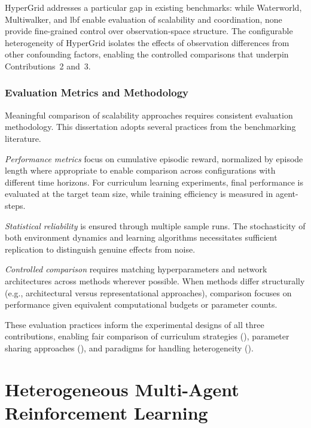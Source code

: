 HyperGrid addresses a particular gap in existing benchmarks: 
while Waterworld, Multiwalker, and \gls{lbf} enable evaluation 
of scalability and coordination, none provide fine-grained 
control over observation-space structure. 
The configurable heterogeneity of HyperGrid isolates the 
effects of observation differences from other confounding factors, 
enabling the controlled comparisons that underpin Contributions~2 and~3.

\subsubsection{Evaluation Metrics and Methodology}

Meaningful comparison of scalability approaches requires consistent evaluation methodology. 
This dissertation adopts several practices from the benchmarking literature.

\textit{Performance metrics} focus on cumulative episodic reward, 
normalized by episode length where appropriate to enable comparison 
across configurations with different time horizons. 
For curriculum learning experiments, final performance is evaluated 
at the target team size, while training efficiency is measured in agent-steps.

\textit{Statistical reliability} is ensured through multiple sample runs. 
The stochasticity of both environment dynamics and learning algorithms 
necessitates sufficient replication to distinguish genuine effects from noise.

\textit{Controlled comparison} requires matching hyperparameters and 
network architectures across methods wherever possible. 
When methods differ structurally (e.g., architectural versus 
representational approaches), comparison focuses on performance 
given equivalent computational budgets or parameter counts.

These evaluation practices inform the experimental designs of all 
three contributions, enabling fair comparison of curriculum strategies 
(), parameter sharing approaches (), 
and paradigms for handling heterogeneity ().

\section{Heterogeneous Multi-Agent Reinforcement Learning}
\label{sec:heterogeneous-marl}


